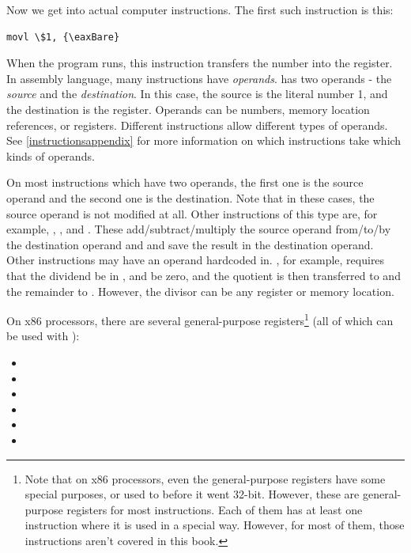 Now we get into actual computer instructions.  The first such instruction is this:

\begin{simpletyping}
\begin{lstlisting}
movl \$1, {\eaxBare}
\end{lstlisting}
\end{simpletyping}

When the program runs, this instruction transfers 
the number  into the {\eaxReg} register.  In assembly language,
many instructions have \emph{operands}.   has two operands - 
the \emph{source} and the \emph{destination}.  In
this case, the source is the literal number 1, and the destination is the
{\eaxReg} register.  Operands can be numbers, memory location references, or
registers.  Different instructions allow different types of operands.  See
\autoref{instructionsappendix} for more information on which 
instructions take which kinds of operands.

On most instructions which
have two operands, the first one is the source operand and the second one
is the destination.  Note that in these cases, the source operand is not
modified at all.  Other instructions of this type are, for example,
, 
, and  
.
These add/subtract/multiply
the source operand from/to/by the destination operand and and save the result
in the destination operand.  Other instructions may have an operand hardcoded
in.  , 
for example, requires that the dividend be
in {\eaxReg}, and {\edxReg} be zero, and the quotient is then transferred to {\eaxReg}
and the remainder to {\edxReg}.  However, the divisor can be any register or 
memory location.

On x86 processors, there are several general-purpose registers\footnote{Note that on x86 processors, even the general-purpose registers have some special purposes, or used to before it went 32-bit.  However, these are general-purpose registers for most instructions.  Each of them has at least one instruction where it is used in a special way.  However, for most of them, those instructions aren't covered in this book.}
 (all of which can be used with ):

\begin{itemize}\item {\eaxRegIdx} 
\item {\ebxRegIdx} 
\item {\ecxRegIdx} 
\item {\edxRegIdx} 
\item {\ediRegIdx} 
\item {\esiRegIdx} 
\end{itemize}

